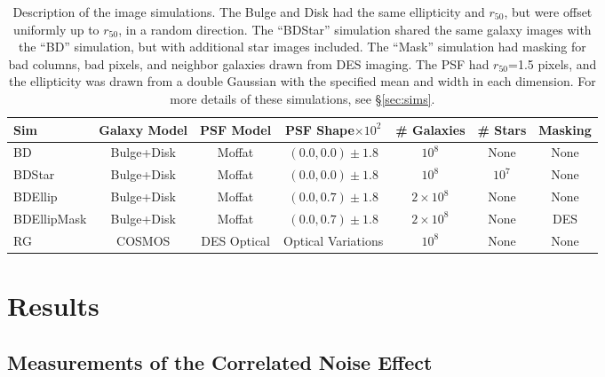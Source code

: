 \documentclass[usegraphicx,usenatbib]{mn2e}
\newcommand{\hlr}{$r_{50}$}
\newcommand{\nsimNgal}{$10^8$}
\newcommand{\nsimNgaltwo}{$2 \times 10^8$}
\newcommand{\nsimNstar}{$10^7$}
\newcommand{\psfdist}{$(0.0,0.7) \pm 1.8$}
\newcommand{\rpsfdist}{$(0.0,0.0) \pm 1.8$}
\begin{document}
\begin{table}
    \centering
    \caption{Description of the image simulations.  The Bulge and Disk
        had the same ellipticity and \hlr, but were
        offset uniformly up to \hlr, in a random direction. The ``BDStar''
    simulation shared the same galaxy images with the ``BD'' simulation, but with additional star
images included.  The ``Mask'' simulation had masking for bad columns, bad pixels, and
neighbor galaxies drawn from DES imaging.  The PSF had \hlr=1.5 pixels, and the ellipticity was drawn from a 
double Gaussian with the specified mean and width in each dimension.  
For more details of these simulations, see \S \ref{sec:sims}.  \label{tab:sims}}
    \begin{tabular}{ | l | c | c | c | c | c | c | }
        Sim          & Galaxy Model & PSF Model & PSF Shape$\times 10^2$ & \# Galaxies & \# Stars    & Masking   \\
        \hline
        BD           & Bulge+Disk   & Moffat    & \rpsfdist     &  \nsimNgal   & None        & None      \\
        BDStar       & Bulge+Disk   & Moffat    & \rpsfdist     &  \nsimNgal   & \nsimNstar  & None      \\
        BDEllip      & Bulge+Disk   & Moffat    & \psfdist  &  \nsimNgaltwo   & None        & None      \\
        BDEllipMask  & Bulge+Disk   & Moffat    & \psfdist  &  \nsimNgaltwo   & None        & DES       \\
        RG           & COSMOS      & DES Optical & Optical Variations &  \nsimNgal   & None        & None      \\
    \end{tabular}
\end{table}


\section{Results} \label{sec:detrendsim}

\subsection{Measurements of the Correlated Noise Effect}
\end{document}
